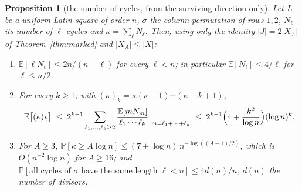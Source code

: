 \documentclass[11pt]{article}
\newtheorem{proposition}[theorem]{Proposition}
\theoremstyle{definition}
\newcommand{\E}{\mathbb{E}}
\renewcommand{\Pr}{\mathbb{P}}
\begin{document}
\begin{proposition}[the number of cycles, from the surviving direction only]\label{prop:tailsurvive}
Let $L$ be a uniform Latin square of order $n$, $\sigma$ the column
permutation of rows $1,2$, $N_\ell$ its number of $\ell$-cycles and
$\kappa=\sum_\ell N_\ell$.  Then, using only the identity
$|J|=2|X_A|$ of Theorem~\ref{thm:marked} and $|X_A|\le|X|$:
\begin{enumerate}[leftmargin=2em]
\item[(i)] $\E[\ell N_\ell]\le2n/(n-\ell)$ for every $\ell<n$; in
particular $\E[N_\ell]\le4/\ell$ for $\ell\le n/2$.
\item[(ii)] For every $k\ge1$, with $(\kappa)_k=\kappa(\kappa-1)\cdots(\kappa-k+1)$,
\[
\E\bigl[(\kappa)_k\bigr]\;\le\;2^{k-1}\sum_{\ell_1,\dots,\ell_k\ge2}\frac{\E[mN_m]}{\ell_1\cdots\ell_k}\Big|_{m=\ell_1+\cdots+\ell_k}
\;\le\;2^{k-1}\Bigl(4+\frac{k^2}{\log n}\Bigr)(\log n)^k .
\]
\item[(iii)] For $A\ge3$, $\Pr[\kappa\ge A\log n]\le(7+\log n)\,n^{-\log((A-1)/2)}$,
which is $O(n^{-2}\log n)$ for $A\ge16$;
and $\Pr[\text{all cycles of }\sigma\text{ have the same length }\ell<n]\le4d(n)/n$,
$d(n)$ the number of divisors.
\end{enumerate}
\end{proposition}
\end{document}
